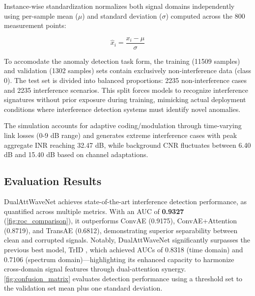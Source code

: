 \documentclass[10pt,twocolumn]{article}
\begin{document}
Instance-wise standardization normalizes both signal domains independently using per-sample mean (\( \mu \)) and standard deviation (\( \sigma \)) computed across the 800 measurement points:

\begin{equation}
    \hat{x}_i = \frac{x_i - \mu}{\sigma}
\end{equation}

To accomodate the anomaly detection task form, the training (11509 samples) and validation (1302 samples) sets contain exclusively non-interference data (class 0). The test set is divided into balanced proportions: 2235 non-interference cases and 2235 interference scenarios. This split forces models to recognize interference signatures without prior exposure during training, mimicking actual deployment conditions where interference detection systems must identify novel anomalies.

The simulation accounts for adaptive coding/modulation through time-varying link losses (0-9 dB range) and generates extreme interference cases with peak aggregate INR reaching 32.47 dB, while background CNR fluctuates between 6.40 dB and 15.40 dB based on channel adaptations.

\subsection{Evaluation Results}

DualAttWaveNet achieves state-of-the-art interference detection performance, as quantified across multiple metrics. With an AUC of \textbf{0.9327} (\autoref{fig:roc_comparison}), it outperforms ConvAE (0.9175), ConvAE+Attention (0.8719), and TransAE (0.6812), demonstrating superior separability between clean and corrupted signals. Notably, DualAttWaveNet significantly surpasses the previous best model, TrID \cite{saifaldawlaGenAIBasedModelsNGSO2024}, which achieved AUCs of 0.8318 (time domain) and 0.7106 (spectrum domain)—highlighting its enhanced capacity to harmonize cross-domain signal features through dual-attention synergy. \autoref{fig:confusion_matrix} evaluates detection performance using a threshold set to the validation set mean plus one standard deviation.
\end{document}
